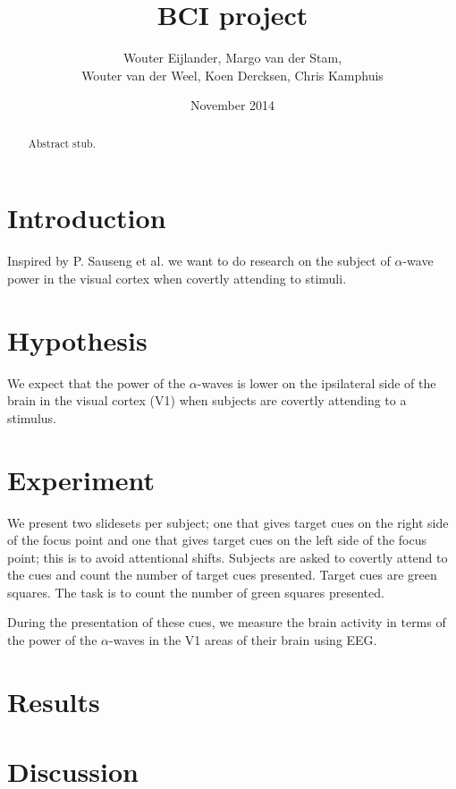 \documentclass{article}
\title{BCI project}
\author{Wouter Eijlander, Margo van der Stam, \\Wouter van der Weel, Koen Dercksen, Chris Kamphuis}
\date{November 2014}
\begin{document}
\maketitle
\begin{abstract}
Abstract stub.
\end{abstract}

\section{Introduction}
Inspired by P. Sauseng et al.\cite{Sauseng2005} we want to do research on the subject of $\alpha$-wave power in the visual cortex when covertly attending to stimuli. 

\section{Hypothesis}
We expect that the power of the $\alpha$-waves is lower on the ipsilateral side of the brain in the visual cortex (V1) when subjects are covertly attending to a stimulus.

\section{Experiment}

We present two slidesets per subject; one that gives target cues on the right side of the focus point and one that gives target cues on the left side of the focus point; this is to avoid attentional shifts. Subjects are asked to covertly attend to the cues and count the number of target cues presented. Target cues are green squares. The task is to count the number of green squares presented.

During the presentation of these cues, we measure the brain activity in terms of the power of the $\alpha$-waves in the V1 areas of their brain using EEG.

\section{Results}

\section{Discussion}



\end{document}
